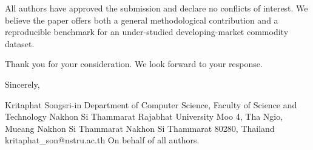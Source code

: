 \documentclass[10pt]{article}
\begin{document}
All authors have approved the submission and declare no conflicts of interest. We believe the paper offers both a general methodological contribution and a reproducible benchmark for an under-studied developing-market commodity dataset.

Thank you for your consideration. We look forward to your response.

Sincerely,

Kritaphat Songsri-in \newline
Department of Computer Science, Faculty of Science and Technology \newline
Nakhon Si Thammarat Rajabhat University  Moo 4, Tha Ngio, Mueang Nakhon Si Thammarat \newline
Nakhon Si Thammarat 80280, Thailand \newline
kritaphat\_son@nstru.ac.th \newline
On behalf of all authors.
\end{document}
